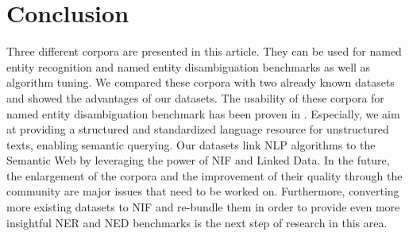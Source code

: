 \section{Conclusion}

Three different corpora are presented in this article. They can be used for named entity recognition and named entity disambiguation benchmarks as well as algorithm tuning.
We compared these corpora with two already known datasets and showed the advantages of our datasets.
The usability of these corpora for named entity disambiguation benchmark has been proven in \cite{Usbeck2013,GER+13}.
Especially, we aim at providing a structured and standardized language resource for unstructured texts, enabling semantic querying.
Our datasets link NLP algorithms to the Semantic Web by leveraging the power of NIF and Linked Data.
In the future, the enlargement of the corpora and the improvement of their quality through the community are major issues that need to be worked on. 
Furthermore, converting more existing datasets to NIF and re-bundle them in order to provide even more insightful NER and NED benchmarks is the next step of research in this area.

